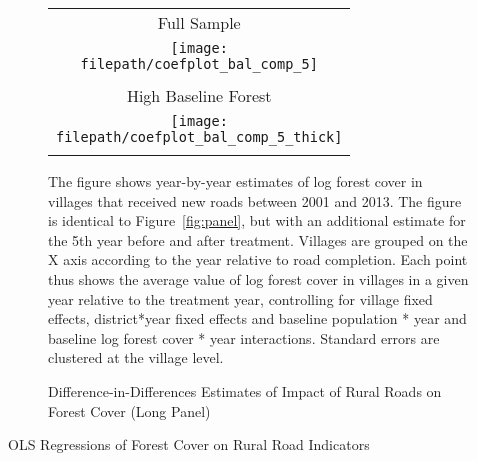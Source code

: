 \begin{figure}[H]
\caption{Difference-in-Differences Estimates of Impact of
    \cnewline Rural Roads on Forest Cover (Long Panel)}
\label{fig:panel_4}
\begin{center}
\begin{tabular}{c}
Full Sample \\
\texttt{[image: \\filepath/coefplot\_bal\_comp\_5]}  \\
\newline \newline \\
High Baseline Forest \\
\texttt{[image: \\filepath/coefplot\_bal\_comp\_5\_thick]}  \\
\newline
\end{tabular}
\end{center}
\newline
\footnotesize{The figure shows year-by-year estimates of log forest
  cover in villages that received new roads between 2001 and 2013. The
  figure is identical to Figure~\ref{fig:panel}, but with an
  additional estimate for the 5th year before and after
  treatment.  Villages are grouped on the X axis according to the year
  relative to road completion. Each point thus shows the average value
  of log forest cover in villages in a given year relative to the
  treatment year, controlling for village fixed effects, district*year
  fixed effects and baseline population * year and baseline log forest
  cover * year interactions. Standard errors are clustered at the
  village level.}
\end{figure}


\begin{table}[H]
\begin{center}
\caption{OLS Regressions of Forest Cover on Rural Road Indicators}
\newcommand{\tablenote}{The table shows estimates from OLS regressions of
  village-level log forest cover in 2001 on an indicator variable that
  takes the value one if a village has a paved road in 2001. Column 1
  presents the bivariate estimates, and Columns 2 through 5 present
  estimates with progressively greater numbers of controls and fixed
  effects. Forest cover is calculated from Vegetation Continuous
  Fields. Population is measured in millions of people.}

\label{tab:ols}
\end{center}
\end{table}

